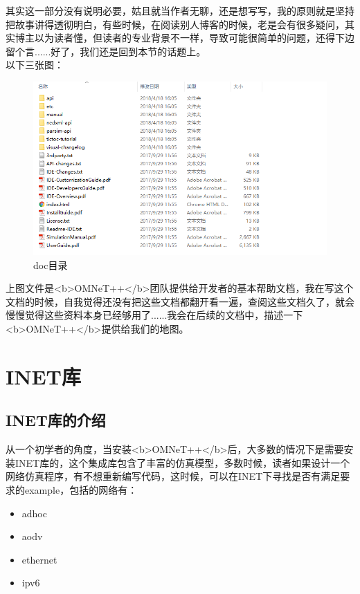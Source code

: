 其实这一部分没有说明必要，姑且就当作者无聊，还是想写写，我的原则就是坚持把故事讲得透彻明白，有些时候，在阅读别人博客的时候，老是会有很多疑问，其实博主以为读者懂，但读者的专业背景不一样，导致可能很简单的问题，还得下边留个言......好了，我们还是回到本节的话题上。\\
以下三张图：
\begin{figure}	
	\centering
	\includegraphics[width=\textwidth]{../img/chapter2/doc}
	\caption{doc目录}\label{fig:1a}		
\end{figure}

上图文件是<b>OMNeT++</b>团队提供给开发者的基本帮助文档，我在写这个文档的时候，自我觉得还没有把这些文档都翻开看一遍，查阅这些文档久了，就会慢慢觉得这些资料本身已经够用了......我会在后续的文档中，描述一下<b>OMNeT++</b>提供给我们的地图。\\

\section{INET库}

\subsection{INET库的介绍}
从一个初学者的角度，当安装<b>OMNeT++</b>后，大多数的情况下是需要安装INET库的，这个集成库包含了丰富的仿真模型，多数时候，读者如果设计一个网络仿真程序，有不想重新编写代码，这时候，可以在INET下寻找是否有满足要求的example，包括的网络有：

\begin{itemize}
\item adhoc
\item aodv
\item ethernet
\item ipv6
\end{itemize}

